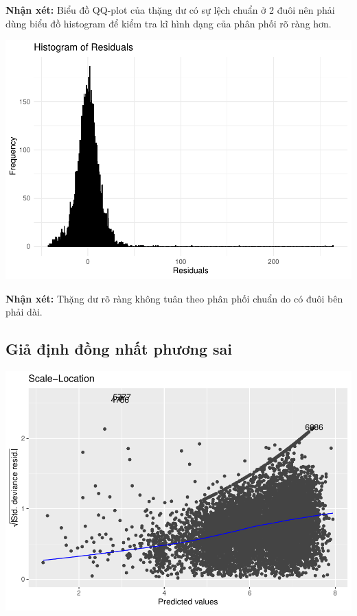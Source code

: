 \documentclass[
  11pt,
  letterpaper,
]{article}
\begin{document}
\textbf{Nhận xét:} Biểu đồ QQ-plot của thặng dư có sự lệch chuẩn ở 2 đuôi nên phải dùng biểu đồ histogram để kiểm tra kĩ hình dạng của phân phối rõ ràng hơn.

\begin{center}\includegraphics[width=1.2\linewidth,]{Final_Project_files/figure-latex/unnamed-chunk-34-1} \end{center}

\textbf{Nhận xét:} Thặng dư rõ ràng không tuân theo phân phối chuẩn do có đuôi bên phải dài.

\subsection{Giả định đồng nhất phương sai}

\begin{center}\includegraphics[width=1.2\linewidth,]{Final_Project_files/figure-latex/unnamed-chunk-35-1} \end{center}
\end{document}
